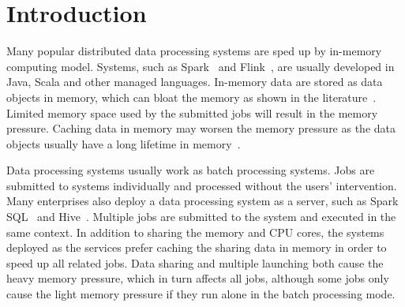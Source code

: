 \section{Introduction}

Many popular distributed data processing systems are sped up by in-memory computing model. Systems, such as Spark~\cite{zaharia2012resilient} and Flink~\cite{hueske2012opening}, are usually developed in Java, Scala and other managed languages. In-memory data are stored as data objects in memory, which can bloat the memory as shown in the literature~\cite{bu:bloat}. 
Limited memory space used by the submitted jobs will result in the memory pressure. 
Caching data in memory may worsen the memory pressure as the data objects usually have a long lifetime in memory~\cite{lulu:deca}. 

Data processing systems usually work as batch processing systems. Jobs are submitted to systems individually and processed without the users' intervention. Many enterprises also deploy a data processing system as a server, such as Spark SQL~\cite{armbrust2015spark} and Hive~\cite{ashish:hive}. Multiple jobs are submitted to the system and executed in the same context. In addition to sharing the memory and CPU cores, the systems deployed as the services prefer caching the sharing data in memory in order to speed up all related jobs.
Data sharing and multiple launching both cause the heavy memory pressure, which in turn affects all jobs, although some jobs only cause the light memory pressure if they run alone in the batch processing mode.


